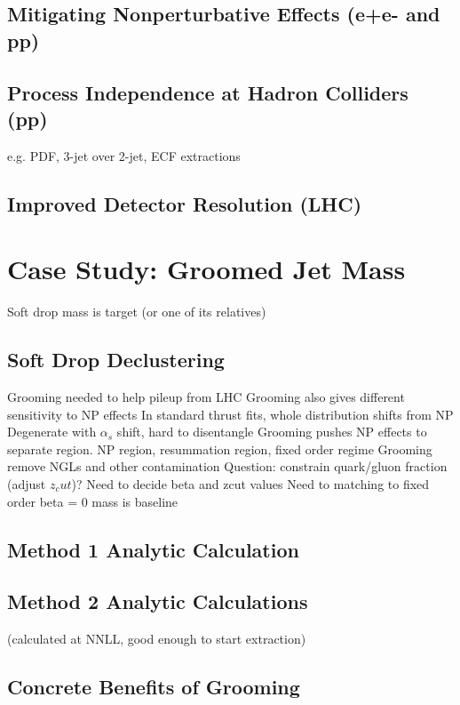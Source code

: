 \documentclass[11pt,letterpaper]{article}
\begin{document}
\subsection{Mitigating Nonperturbative Effects (e+e- and pp)}

\subsection{Process Independence at Hadron Colliders (pp)}

e.g. PDF, 3-jet over 2-jet, ECF extractions

\subsection{Improved Detector Resolution (LHC) }

\section{Case Study: Groomed Jet Mass}

Soft drop mass is target (or one of its relatives)

\subsection{Soft Drop Declustering}

	Grooming needed to help pileup from LHC
	Grooming also gives different sensitivity to NP effects
		In standard thrust fits, whole distribution shifts from NP
		Degenerate with $\alpha_s$ shift, hard to disentangle
		Grooming pushes NP effects to separate region.
		NP region, resummation region, fixed order regime
	Grooming remove NGLs and other contamination
	Question:  constrain quark/gluon fraction (adjust $z_cut$)?
	Need to decide beta and zcut values
	Need to matching to fixed order
	beta = 0 mass is baseline


\subsection{Method 1 Analytic Calculation}

\subsection{Method 2 Analytic Calculations}


(calculated at NNLL, good enough to start extraction)

\subsection{Concrete Benefits of Grooming}
\end{document}
